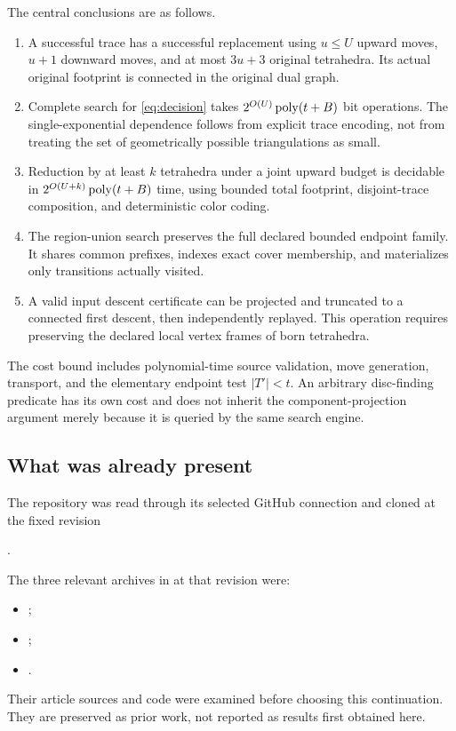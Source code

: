 The central conclusions are as follows.
\begin{enumerate}
\item A successful trace has a successful replacement using $u\le U$
upward moves, $u+1$ downward moves, and at most $3u+3$ original tetrahedra.
Its actual original footprint is connected in the original dual graph.
\item Complete search for \eqref{eq:decision} takes
$2^{O(U)}\operatorname{poly}(t+B)$ bit operations. The single-exponential dependence follows
from explicit trace encoding, not from treating the set of geometrically
possible triangulations as small.
\item Reduction by at least $k$ tetrahedra under a joint upward budget
is decidable in $2^{O(U+k)}\operatorname{poly}(t+B)$ time, using bounded total footprint,
disjoint-trace composition, and deterministic color coding.
\item The region-union search preserves the full declared bounded endpoint
family. It shares common prefixes, indexes exact cover membership, and
materializes only transitions actually visited.
\item A valid input descent certificate can be projected and truncated to a
connected first descent, then independently replayed. This operation requires
preserving the declared local vertex frames of born tetrahedra.
\end{enumerate}

The cost bound includes polynomial-time source validation, move generation,
transport, and the elementary endpoint test $|T'|<t$. An arbitrary disc-finding
predicate has its own cost and does not inherit the component-projection
argument merely because it is queried by the same search engine.

\subsection{What was already present}

The repository was read through its selected GitHub connection and cloned at
the fixed revision
\begin{center}.\end{center}
The three relevant archives in  at that revision were:
\begin{itemize}
\item {};
\item {};
\item {}.
\end{itemize}
Their article sources and code were examined before choosing this continuation.
They are preserved as prior work, not reported as results first obtained here.

